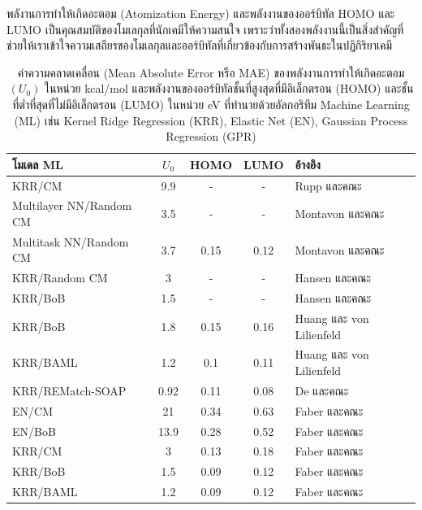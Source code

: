 พลังานการทำให้เกิดอะตอม (Atomization Energy) และพลังงานของออร์บิทัล HOMO และ LUMO เป็นคุณสมบัติของโมเลกุลที่นักเคมีให้ความสนใจ%
เพราะว่าทั้งสองพลังงานนี้เป็นสิ่งสำคัญที่ช่วยให้เราเข้าใจความเสถียรของโมเลกุลและออร์บิทัลที่เกี่ยวข้องกับการสร้างพันธะในปฏิกิริยาเคมี

\begin{table}[H]
    \begin{threeparttable}[b]
    \centering
    \caption{ค่าความคลาดเคลื่อน (Mean Absolute Error หรือ MAE) ของพลังงานการทำให้เกิดอะตอม $(U_{0})$ ในหน่วย kcal/mol 
    และพลังงานของออร์บิทัลชั้นที่สูงสุดที่มีอิเล็กตรอน (HOMO) และชั้นที่ต่ำที่สุดที่ไม่มีอิเล็กตรอน (LUMO) ในหน่วย eV ที่ทำนายด้วยอัลกอริทึม 
    Machine Learning (ML) เช่น Kernel Ridge Regression (KRR), Elastic Net (EN), Gaussian Process Regression 
    (GPR)}
    \label{tab:pred_ener_atom_orb_ml}
    \begin{tabular}{lcccl}
    \toprule
    \textbf{โมเดล ML} &\textbf{$U_{0}$} &HOMO &LUMO &\textbf{อ้างอิง} \\
    \midrule
    KRR/CM\tnote{1} &9.9 &- &- &Rupp และคณะ\autocite{rupp2012} \\
    Multilayer NN/Random CM\tnote{1} &3.5 &- &- &Montavon และคณะ\autocite{montavon2012} \\
    Multitask NN/Random CM\tnote{2} &3.7 &0.15 &0.12 &Montavon และคณะ\autocite{montavon2013} \\
    KRR/Random CM\tnote{1} &3 &- &- &Hansen และคณะ\autocite{hansen2013} \\
    KRR/BoB\tnote{1} &1.5 &- &- &Hansen และคณะ\autocite{hansen2015} \\
    KRR/BoB\tnote{2} &1.8 &0.15 &0.16 &Huang และ von Lilienfeld\autocite{huang2016} \\
    KRR/BAML\tnote{2} &1.2 &0.1 &0.11 &Huang และ von Lilienfeld\autocite{huang2016} \\
    KRR/REMatch-SOAP\tnote{2} &0.92 &0.11 &0.08 &De และคณะ\autocite{de2016} \\
    EN/CM\tnote{3} &21 &0.34 &0.63 &Faber และคณะ\autocite{faber2017} \\
    EN/BoB\tnote{3} &13.9 &0.28 &0.52 &Faber และคณะ\autocite{faber2017} \\
    KRR/CM\tnote{3} &3 &0.13 &0.18 &Faber และคณะ\autocite{faber2017} \\
    KRR/BoB\tnote{3} &1.5 &0.09 &0.12 &Faber และคณะ\autocite{faber2017} \\
    KRR/BAML\tnote{3} &1.2 &0.09 &0.12 &Faber และคณะ\autocite{faber2017} \\

\end{tabular}
\end{threeparttable}
\end{table}
